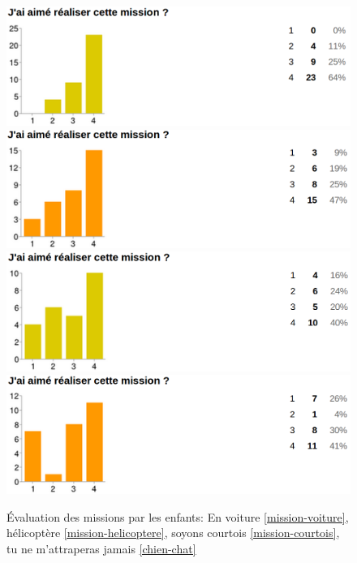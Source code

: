 \begin{figure}[ht]
  \begin{center}
    \includegraphics[scale=0.3]{content/8-validation/images/voiture}
    \includegraphics[scale=0.3]{content/8-validation/images/helico}
    \includegraphics[scale=0.3]{content/8-validation/images/courtois}
    \includegraphics[scale=0.3]{content/8-validation/images/chien}
    \caption{Évaluation des missions par les enfants: En voiture \ref{mission-voiture}, hélicoptère \ref{mission-helicoptere}, soyons courtois \ref{mission-courtois}, tu ne m'attraperas jamais \ref{chien-chat}}
    \label{fig:evaluation-mission}
  \end{center}
\end{figure}

